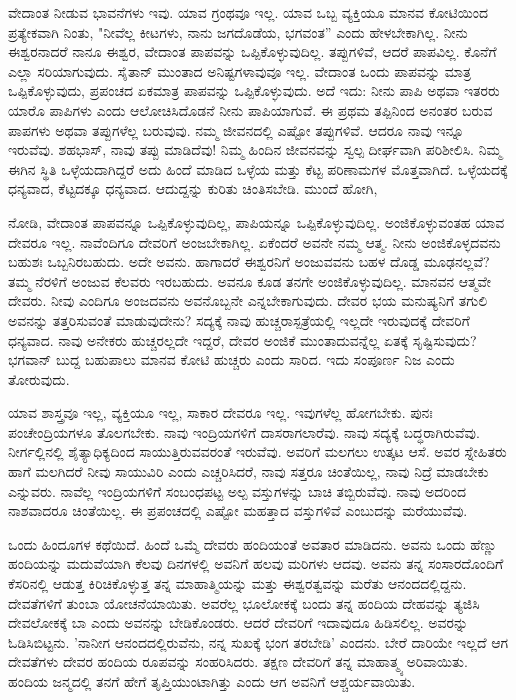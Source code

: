 ವೇದಾಂತ ನೀಡುವ ಭಾವನೆಗಳು ಇವು. ಯಾವ ಗ್ರಂಥವೂ ಇಲ್ಲ. ಯಾವ ಒಬ್ಬ ವ್ಯಕ್ತಿಯೂ ಮಾನವ ಕೋಟಿಯಿಂದ ಪ್ರತ್ಯೇಕವಾಗಿ ನಿಂತು, "ನೀವೆಲ್ಲ ಕೀಟಗಳು, ನಾನು ಜಗದೊಡೆಯ, ಭಗವಂತ'' ಎಂದು ಹೇಳಬೇಕಾಗಿಲ್ಲ. ನೀನು ಈಶ್ವರನಾದರೆ ನಾನೂ ಈಶ್ವರ, ವೇದಾಂತ ಪಾಪವನ್ನು ಒಪ್ಪಿಕೊಳ್ಳುವುದಿಲ್ಲ. ತಪ್ಪುಗಳಿವೆ, ಆದರೆ ಪಾಪವಿಲ್ಲ. ಕೊನೆಗೆ ಎಲ್ಲಾ ಸರಿಯಾಗುವುದು. ಸೈತಾನ್ ಮುಂತಾದ ಅನಿಷ್ಟಗಳಾವುವೂ ಇಲ್ಲ. ವೇದಾಂತ ಒಂದು ಪಾಪವನ್ನು ಮಾತ್ರ ಒಪ್ಪಿಕೊಳ್ಳುವುದು, ಪ್ರಪಂಚದ ಏಕಮಾತ್ರ ಪಾಪವನ್ನು ಒಪ್ಪಿಕೊಳ್ಳುವುದು. ಅದೆ ಇದು: ನೀನು ಪಾಪಿ ಅಥವಾ ಇತರರು ಯಾರೊ ಪಾಪಿಗಳು ಎಂದು ಆಲೋಚಿಸಿದೊಡನೆ ನೀನು ಪಾಪಿಯಾಗುವೆ. ಈ ಪ್ರಥಮ ತಪ್ಪಿನಿಂದ ಅನಂತರ ಬರುವ ಪಾಪಗಳು ಅಥವಾ ತಪ್ಪುಗಳೆಲ್ಲ ಬರುವುವು. ನಮ್ಮ ಜೀವನದಲ್ಲಿ ಎಷ್ಟೋ ತಪ್ಪುಗಳಿವೆ. ಆದರೂ ನಾವು ಇನ್ನೂ ಇರುವೆವು. ಶಹಭಾಸ್, ನಾವು ತಪ್ಪು ಮಾಡಿದೆವು! ನಿಮ್ಮ ಹಿಂದಿನ ಜೀವನವನ್ನು ಸ್ವಲ್ಪ ದೀರ್ಘವಾಗಿ ಪರಿಶೀಲಿಸಿ. ನಿಮ್ಮ ಈಗಿನ ಸ್ಥಿತಿ ಒಳ್ಳೆಯದಾಗಿದ್ದರೆ ಅದು ಹಿಂದೆ ಮಾಡಿದ ಒಳ್ಳೆಯ ಮತ್ತು ಕೆಟ್ಟ ಪರಿಣಾಮಗಳ ಮೊತ್ತವಾಗಿದೆ. ಒಳ್ಳೆಯದಕ್ಕೆ ಧನ್ಯವಾದ, ಕೆಟ್ಟದಕ್ಕೂ ಧನ್ಯವಾದ. ಆದುದ್ದನ್ನು ಕುರಿತು ಚಿಂತಿಸಬೇಡಿ. ಮುಂದೆ ಹೋಗಿ,

ನೋಡಿ, ವೇದಾಂತ ಪಾಪವನ್ನೂ ಒಪ್ಪಿಕೊಳ್ಳುವುದಿಲ್ಲ, ಪಾಪಿಯನ್ನೂ ಒಪ್ಪಿಕೊಳ್ಳುವುದಿಲ್ಲ. ಅಂಜಿಕೊಳ್ಳುವಂತಹ ಯಾವ ದೇವರೂ ಇಲ್ಲ. ನಾವೆಂದಿಗೂ ದೇವರಿಗೆ ಅಂಜಬೇಕಾಗಿಲ್ಲ. ಏಕೆಂದರೆ ಅವನೇ ನಮ್ಮ ಆತ್ಮ. ನೀನು ಅಂಜಿಕೊಳ್ಳದವನು ಬಹುಶಃ ಒಬ್ಬನಿರಬಹುದು. ಅದೇ ಅವನು. ಹಾಗಾದರೆ ಈಶ್ವರನಿಗೆ ಅಂಜುವವನು ಬಹಳ ದೊಡ್ಡ ಮೂಢನಲ್ಲವೆ? ತಮ್ಮ ನೆರಳಿಗೆ ಅಂಜುವ ಕೆಲವರು ಇರಬಹುದು. ಅವನೂ ಕೂಡ ತನಗೇ ಅಂಜಿಕೊಳ್ಳುವುದಿಲ್ಲ. ಮಾನವನ ಆತ್ಮವೇ ದೇವರು. ನೀವು ಎಂದಿಗೂ ಅಂಜದವನು ಅವನೊಬ್ಬನೇ ಎನ್ನಬೇಕಾಗುವುದು. ದೇವರ ಭಯ ಮನುಷ್ಯನಿಗೆ ತಗುಲಿ ಅವನನ್ನು ತತ್ತರಿಸುವಂತೆ ಮಾಡುವುದೇನು? ಸದ್ಯಕ್ಕೆ ನಾವು ಹುಚ್ಚರಾಸ್ಪತ್ರೆಯಲ್ಲಿ ಇಲ್ಲದೇ ಇರುವುದಕ್ಕೆ ದೇವರಿಗೆ ಧನ್ಯವಾದ. ನಾವು ಅನೇಕರು ಹುಚ್ಚರಲ್ಲದೇ ಇದ್ದರೆ, ದೇವರ ಅಂಜಿಕೆ ಮುಂತಾದುವನ್ನೆಲ್ಲ ಏತಕ್ಕೆ ಸೃಷ್ಟಿಸುವುದು? ಭಗವಾನ್ ಬುದ್ದ ಬಹುಪಾಲು ಮಾನವ ಕೋಟಿ ಹುಚ್ಚರು ಎಂದು ಸಾರಿದ. ಇದು ಸಂಪೂರ್ಣ ನಿಜ ಎಂದು ತೋರುವುದು.

ಯಾವ ಶಾಸ್ತ್ರವೂ ಇಲ್ಲ, ವ್ಯಕ್ತಿಯೂ ಇಲ್ಲ, ಸಾಕಾರ ದೇವರೂ ಇಲ್ಲ. ಇವುಗಳೆಲ್ಲ ಹೋಗಬೇಕು. ಪುನಃ ಪಂಚೇಂದ್ರಿಯಗಳೂ ತೊಲಗಬೇಕು. ನಾವು ಇಂದ್ರಿಯಗಳಿಗೆ ದಾಸರಾಗಲಾರೆವು. ನಾವು ಸದ್ಯಕ್ಕೆ ಬದ್ಧರಾಗಿರುವೆವು. ನೀರ್ಗಲ್ಲಿನಲ್ಲಿ ಶೈತ್ಯಾಧಿಕ್ಯದಿಂದ ಸಾಯುತ್ತಿರುವವರಂತೆ ಇರುವೆವು. ಅವರಿಗೆ ಮಲಗಲು ಉತ್ಕಟ ಆಸೆ. ಅವರ ಸ್ನೇಹಿತರು ಹಾಗೆ ಮಲಗಿದರೆ ನೀವು ಸಾಯುವಿರಿ ಎಂದು ಎಚ್ಚರಿಸಿದರೆ, ನಾವು ಸತ್ತರೂ ಚಿಂತೆಯಿಲ್ಲ, ನಾವು ನಿದ್ರೆ ಮಾಡಬೇಕು ಎನ್ನುವರು. ನಾವೆಲ್ಲ ಇಂದ್ರಿಯಗಳಿಗೆ ಸಂಬಂಧಪಟ್ಟ ಅಲ್ಪ ವಸ್ತುಗಳನ್ನು ಬಾಚಿ ತಬ್ಬಿರುವೆವು. ನಾವು ಅದರಿಂದ ನಾಶವಾದರೂ ಚಿಂತೆಯಿಲ್ಲ. ಈ ಪ್ರಪಂಚದಲ್ಲಿ ಎಷ್ಟೋ ಮಹತ್ತಾದ ವಸ್ತುಗಳಿವೆ ಎಂಬುದನ್ನು ಮರೆಯುವೆವು.

ಒಂದು ಹಿಂದೂಗಳ ಕಥೆಯಿದೆ. ಹಿಂದೆ ಒಮ್ಮೆ ದೇವರು ಹಂದಿಯಂತೆ ಅವತಾರ ಮಾಡಿದನು. ಅವನು ಒಂದು ಹೆಣ್ಣು ಹಂದಿಯನ್ನು ಮದುವೆಯಾಗಿ ಕೆಲವು ದಿನಗಳಲ್ಲಿ ಅವನಿಗೆ ಹಲವು ಮರಿಗಳು ಆದವು. ಅವನು ತನ್ನ ಸಂಸಾರದೊಂದಿಗೆ ಕೆಸರಿನಲ್ಲಿ ಆಡುತ್ತ ಕಿರಿಚಿಕೊಳ್ಳುತ್ತ ತನ್ನ ಮಾಹಾತ್ಮಿಯನ್ನು ಮತ್ತು ಈಶ್ವರತ್ವವನ್ನು ಮರೆತು ಆನಂದದಲ್ಲಿದ್ದನು. ದೇವತೆಗಳಿಗೆ ತುಂಬಾ ಯೋಚನೆಯಾಯಿತು. ಅವರೆಲ್ಲ ಭೂಲೋಕಕ್ಕೆ ಬಂದು ತನ್ನ ಹಂದಿಯ ದೇಹವನ್ನು ತ್ಯಜಿಸಿ ದೇವಲೋಕಕ್ಕೆ ಬಾ ಎಂದು ಅವನನ್ನು ಬೇಡಿಕೊಂಡರು. ಆದರೆ ದೇವರಿಗೆ ಇದಾವುದೂ ಹಿಡಿಸಲಿಲ್ಲ. ಅವರನ್ನು ಓಡಿಸಿಬಿಟ್ಟನು. 'ನಾನೀಗ ಆನಂದದಲ್ಲಿರುವೆನು, ನನ್ನ ಸುಖಕ್ಕೆ ಭಂಗ ತರಬೇಡಿ' ಎಂದನು. ಬೇರೆ ದಾರಿಯೇ ಇಲ್ಲದೆ ಆಗ ದೇವತೆಗಳು ದೇವರ ಹಂದಿಯ ರೂಪವನ್ನು ಸಂಹರಿಸಿದರು. ತಕ್ಷಣ ದೇವರಿಗೆ ತನ್ನ ಮಾಹಾತ್ಮ್ಯ ಅರಿವಾಯಿತು. ಹಂದಿಯ ಜನ್ಮದಲ್ಲಿ ತನಗೆ ಹೇಗೆ ತೃಪ್ತಿಯುಂಟಾಗಿತ್ತು ಎಂದು ಆಗ ಅವನಿಗೆ ಆಶ್ಚರ್ಯವಾಯಿತು.

